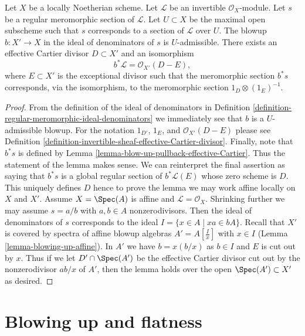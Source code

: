 \begin{lemma}
\label{lemma-blowing-up-denominators}
Let $X$ be a locally Noetherian scheme.
Let $\mathcal{L}$ be an invertible $\mathcal{O}_X$-module.
Let $s$ be a regular meromorphic section of $\mathcal{L}$.
Let $U \subset X$ be the maximal open subscheme such that
$s$ corresponds to a section of $\mathcal{L}$ over $U$.
The blowup $b : X' \to X$ in the ideal of denominators
of $s$ is $U$-admissible. There exists an effective Cartier divisor
$D \subset X'$ and an isomorphism
$$
b^*\mathcal{L} = \mathcal{O}_{X'}(D - E),
$$
where $E \subset X'$ is the exceptional divisor such that the
meromorphic section $b^*s$ corresponds, via the isomorphism,
to the meromorphic section $1_D \otimes (1_E)^{-1}$.
\end{lemma}

\begin{proof}
From the definition of the ideal of denominators in
Definition
\ref{definition-regular-meromorphic-ideal-denominators}
we immediately see that $b$ is a $U$-admissible blowup.
For the notation $1_{D'}$, $1_E$, and $\mathcal{O}_{X'}(D - E)$
please see Definition
\ref{definition-invertible-sheaf-effective-Cartier-divisor}.
Finally, note that $b^*s$ is defined by
Lemma \ref{lemma-blow-up-pullback-effective-Cartier}.
Thus the statement of the lemma makes sense.
We can reinterpret the final assertion as saying
that $b^*s$ is a global regular section of
$b^*\mathcal{L}(E)$ whose zero scheme is $D$.
This uniquely defines $D$ hence
to prove the lemma we may work affine locally on $X$ and $X'$.
Assume $X = \Spec(A)$ is affine and
$\mathcal{L} = \mathcal{O}_X$. Shrinking further we may assume
$s = a/b$ with $a, b \in A$ nonzerodivisors.
Then the ideal of denominators of $s$ corresponds
to the ideal $I = \{x \in A \mid xa \in bA\}$.
Recall that $X'$ is covered by spectra of affine blowup
algebras $A' = A[\frac{I}{x}]$ with $x \in I$
(Lemma \ref{lemma-blowing-up-affine}).
In $A'$ we have $b = x (b/x)$ as $b \in I$
and $E$ is cut out by $x$.
Thus if we let $D' \cap \Spec(A')$ be the effective
Cartier divisor cut out by the nonzerodivisor $ab/x$ of $A'$, then
the lemma holds over the open $\Spec(A') \subset X'$ as desired.
\end{proof}





\section{Blowing up and flatness}
\label{section-blowup-flat}

